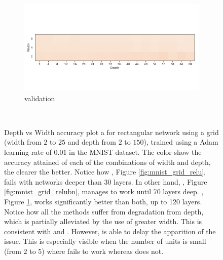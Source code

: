 \begin{figure}
\begin{subfigure}[b]{0.3\textwidth}
        \includegraphics[width=\textwidth]{img/mnist_grid/val-acc-sep-up-1e-08-ks-3x3-bs-1024.pdf}
        \caption{\SepUnitPoint validation}
        \label{fig:mnist_grid_up}
    \end{subfigure}
    ~ %
    
  \caption{Depth vs Width accuracy plot a for rectangular network using a grid (width from $2$ to $25$ and depth from $2$ to $150$),  trained using a Adam learning rate of $0.01$ in the MNIST dataset. The color show the accuracy attained of each of the combinations of width and depth, the clearer the better. Notice how \ReLU, Figure \ref{fig:mnist_grid_relu}, fails with networks deeper than 30 layers. In other hand, \ReLUBN, Figure \ref{fig:mnist_grid_relubn}, manages to work until 70 layers deep. \SepUnitPoint,  Figure \ref{fig:mnist_grid_up}, works significantly better than both, up to 120 layers. Notice how all the methods suffer from degradation from depth, which is partially alleviated by the use of greater width. This is consistent with \cite{simpnet} and \cite{densenet}. However, \SepUnitPoint is able to delay the apparition of the issue. This is especially visible when the number of units is small (from $2$ to $5$) where \ReLUBN fails to work whereas \SepUnitPoint does not.}
  \label{fig:mnist_grid} 
\end{figure}
